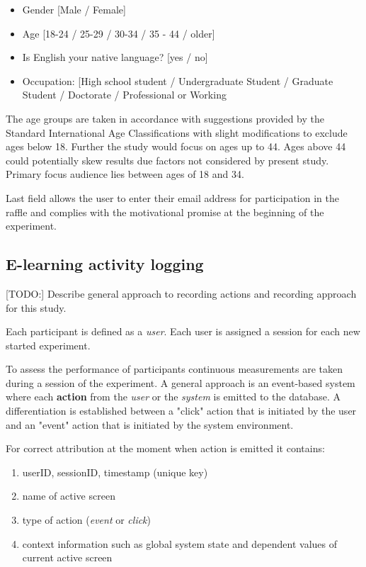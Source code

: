 	\begin{itemize}
		\item Gender [Male / Female]
		\item Age [18-24 / 25-29 / 30-34 / 35 - 44 / older]
		\item Is English your native language? [yes / no]
		\item Occupation: [High school student / Undergraduate Student / Graduate Student / Doctorate / Professional or Working
	\end{itemize}

	The age groups are taken in accordance with suggestions provided by the Standard International Age Classifications \cite{UN1982} with slight modifications to exclude ages below 18. Further the study would focus on ages up to 44. Ages above 44 could potentially skew results due factors not considered by present study. Primary focus audience lies between ages of 18 and 34.
	
	Last field allows the user to enter their email address for participation in the raffle and complies with the motivational promise at the beginning of the experiment.

	\subsection{E-learning activity logging} \label{sec:activitylog}
	
	[TODO:] Describe general approach to recording actions and recording approach for this study.
	
	Each participant is defined as a \textit{user}. Each user is assigned a session for each new started experiment. 
	
	To assess the performance of participants continuous measurements are taken during a session of the experiment. A general approach is an event-based system where each \textbf{action} from the \textit{user} or the \textit{system} is emitted to the database. A differentiation is established between a "click" action that is initiated by the user and an "event" action that is initiated by the system environment.
	
	For correct attribution at the moment when action is emitted it contains: 
	\begin{enumerate}
		\item userID, sessionID, timestamp (unique key)
		\item name of active screen
		\item type of action (\textit{event} or \textit{click})
		\item context information such as global system state and dependent values of current active screen
	\end{enumerate}

